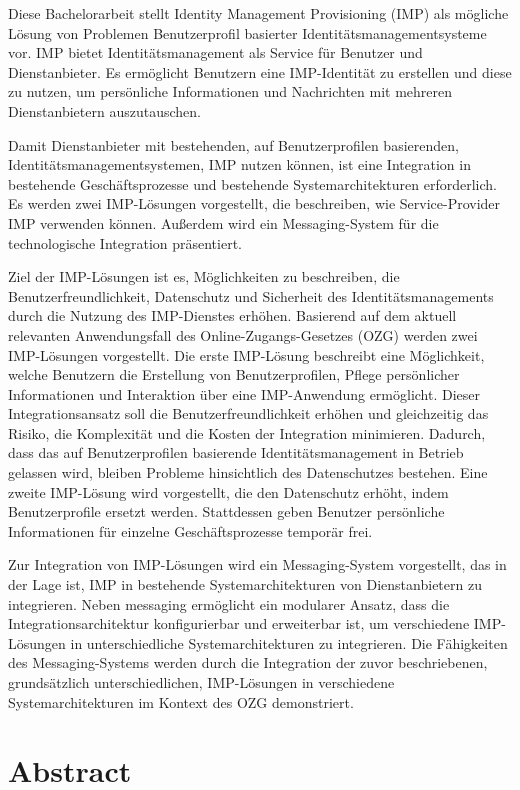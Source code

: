 \documentclass[
     12pt,         %
     a4paper,      %
     BCOR=10mm,version=first,     %
     DIV=14,version=first,        %
     ]{scrreprt}
\begin{document}
Diese Bachelorarbeit stellt Identity Management Provisioning (IMP) als mögliche Lösung von Problemen Benutzerprofil basierter Identitätsmanagementsysteme vor. IMP bietet Identitätsmanagement als Service für Benutzer und Dienstanbieter. Es ermöglicht Benutzern eine IMP-Identität zu erstellen und diese zu nutzen, um persönliche Informationen und Nachrichten mit mehreren Dienstanbietern auszutauschen.

Damit Dienstanbieter mit bestehenden, auf Benutzerprofilen basierenden, Identitätsmanagementsystemen, IMP nutzen können, ist eine Integration in bestehende Geschäftsprozesse und bestehende Systemarchitekturen erforderlich. Es werden zwei IMP-Lösungen vorgestellt, die beschreiben, wie Service-Provider IMP verwenden können. Außerdem wird ein Messaging-System für die technologische Integration präsentiert.

Ziel der IMP-Lösungen ist es, Möglichkeiten zu beschreiben, die Benutzerfreundlichkeit, Datenschutz und Sicherheit des Identitätsmanagements durch die Nutzung des IMP-Dienstes erhöhen. Basierend auf dem aktuell relevanten Anwendungsfall des Online-Zugangs-Gesetzes (OZG) werden zwei IMP-Lösungen vorgestellt. Die erste IMP-Lösung beschreibt eine Möglichkeit, welche Benutzern die Erstellung von Benutzerprofilen, Pflege persönlicher Informationen und Interaktion über eine IMP-Anwendung ermöglicht. Dieser Integrationsansatz soll die Benutzerfreundlichkeit erhöhen und gleichzeitig das Risiko, die Komplexität und die Kosten der Integration minimieren. Dadurch, dass das auf Benutzerprofilen basierende Identitätsmanagement in Betrieb gelassen wird, bleiben Probleme hinsichtlich des Datenschutzes bestehen. Eine zweite IMP-Lösung wird vorgestellt, die den Datenschutz erhöht, indem Benutzerprofile ersetzt werden. Stattdessen geben Benutzer persönliche Informationen für einzelne Geschäftsprozesse temporär frei.   

Zur Integration von IMP-Lösungen wird ein Messaging-System vorgestellt, das in der Lage ist, IMP in bestehende Systemarchitekturen von Dienstanbietern zu integrieren. Neben messaging ermöglicht ein modularer Ansatz, dass die Integrationsarchitektur konfigurierbar und erweiterbar ist, um verschiedene IMP-Lösungen in unterschiedliche Systemarchitekturen zu integrieren. Die Fähigkeiten des Messaging-Systems werden durch die Integration der zuvor beschriebenen, grundsätzlich unterschiedlichen, IMP-Lösungen in verschiedene Systemarchitekturen im Kontext des OZG demonstriert.


\chapter*{Abstract}
\end{document}
